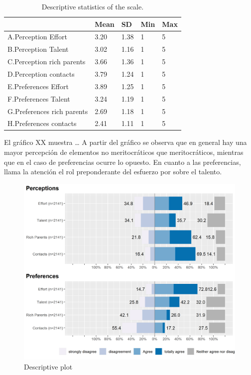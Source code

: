 \documentclass[
]{article}
\begin{document}
\begin{table}

\caption{\label{tab:unnamed-chunk-10}Descriptive statistics of the scale.}
\centering
\fontsize{9}{11}\selectfont
\begin{tabular}[t]{lllll}
\toprule
  & Mean & SD & Min & Max\\
\midrule
A.Perception Effort & 3.20 & 1.38 & 1 & 5\\
B.Perception Talent & 3.02 & 1.16 & 1 & 5\\
C.Perception rich parents & 3.66 & 1.36 & 1 & 5\\
D.Perception contacts & 3.79 & 1.24 & 1 & 5\\
E.Preferences Effort & 3.89 & 1.25 & 1 & 5\\
F.Preferences Talent & 3.24 & 1.19 & 1 & 5\\
G.Preferences rich parents & 2.69 & 1.18 & 1 & 5\\
H.Preferences contacts & 2.41 & 1.11 & 1 & 5\\
\bottomrule
\end{tabular}
\end{table}

El gráfico XX muestra \ldots{} A partir del gráfico se observa que en
general hay una mayor percepción de elementos no meritocráticos que
meritocráticos, mientras que en el caso de preferencias ocurre lo
opuesto. En cuanto a las preferencias, llama la atención el rol
preponderante del esfuerzo por sobre el talento.

\begin{figure}
\centering
\includegraphics[width=11\textwidth,height=\textheight]{../output/images/plotlikert.png}
\caption{Descriptive plot}
\end{figure}
\end{document}

